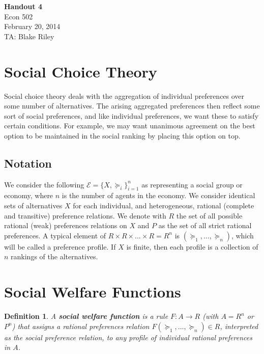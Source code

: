 \documentclass[letter, 10pt]{article}
\theoremstyle{basic}
\newtheorem{definition}{Definition}[section]
\begin{document}
\begin{spacing}{1.0}

\noindent
\textbf{Handout 4} \\
Econ 502 \\
February 20, 2014 \\
TA: Blake Riley \\

\section{Social Choice Theory}

Social choice theory deals with the aggregation of
individual preferences over some number of
alternatives. The arising aggregated preferences then
reflect some sort of social preferences, and like
individual preferences, we want these to satisfy certain
conditions. For example, we may want unanimous agreement
on the best option to be maintained in the social ranking
by placing this option on top.

\subsection{Notation}

We consider the following $\mathcal{E} = \{X,
\succeq_i\}_{i=1}^n$ as representing a social group or
economy, where $n$ is the number of agents in the
economy. We consider identical sets of alternatives $X$
for each individual, and heterogeneous, rational
(complete and transitive) preference relations. We denote
with $R$ the set of all possible rational (weak)
preferences relations on $X$ and $P$ as the set of all
strict rational preferences. A typical element of $R
\times R \times \ldots \times R = R^n$ is $(\succeq_1,
\ldots, \succeq_n)$, which will be called a preference
profile. If $X$ is finite, then each profile is a
collection of $n$ rankings of the alternatives.

\section{Social Welfare Functions}

\begin{definition}
  A \textbf{social welfare function} is a rule $F: A\to
  R$ (with $A= R^n$ or $P^n$) that assigns a rational
  preferences relation $F(\succeq_1, \ldots, \succeq_n)
  \in R$, interpreted as the social preference relation,
  to any profile of individual rational preferences in $A$.
\end{definition}


\end{spacing}
\end{document}
